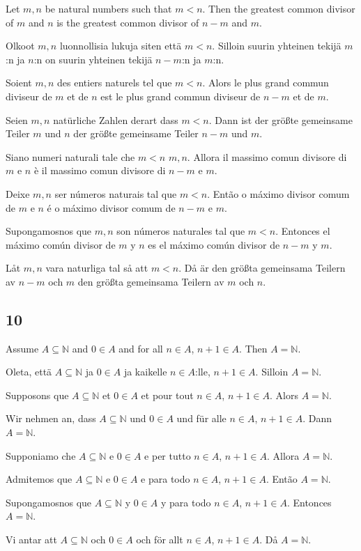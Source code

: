 \documentclass{article}
\begin{document}
Let $ m, n $ be natural numbers such that $ m < n $. Then the greatest common divisor of $ m $ and $ n $ is the greatest common divisor of $ n-m $ and $ m $.

Olkoot $ m, n $ luonnollisia lukuja siten että $ m < n $. Silloin suurin yhteinen tekijä $ m $:n ja $ n $:n on suurin yhteinen tekijä $ n-m $:n ja $ m $:n.

Soient $ m, n $ des entiers naturels tel que $ m < n $. Alors le plus grand commun diviseur de $ m $ et de $ n $ est le plus grand commun diviseur de $ n-m $ et de $ m $.

Seien $ m, n $ natürliche Zahlen derart dass $ m < n $. Dann ist der größte gemeinsame Teiler $ m $ und $ n $ der größte gemeinsame Teiler $ n-m $ und $ m $.

Siano numeri naturali tale che $ m < n $ $ m, n $. Allora il massimo comun divisore di $ m $ e $ n $ è il massimo comun divisore di $ n-m $ e $ m $.

Deixe $ m, n $ ser números naturais tal que $ m < n $. Então o máximo divisor comum de $ m $ e $ n $ é o máximo divisor comum de $ n-m $ e $ m $.

Supongamosnos que $ m, n $ son números naturales tal que $ m < n $. Entonces el máximo común divisor de $ m $ y $ n $ es el máximo común divisor de $ n-m $ y $ m $.

Låt $ m, n $ vara naturliga tal så att $ m < n $. Då är den größta gemeinsama Teilern av $ n-m $ och $ m $ den größta gemeinsama Teilern av $ m $ och $ n $.

\subsection*{10}

Assume $ A \subseteq \mathbb{N} $ and $ 0 \in A $ and for all $ n \in A $, $ n + 1 \in A $. Then $ A = \mathbb{N} $.

Oleta, että $ A \subseteq \mathbb{N} $ ja $ 0 \in A $ ja kaikelle $ n \in A $:lle, $ n + 1 \in A $. Silloin $ A = \mathbb{N} $.

Supposons que $ A \subseteq \mathbb{N} $ et $ 0 \in A $ et pour tout $ n \in A $, $ n + 1 \in A $. Alors $ A = \mathbb{N} $.

Wir nehmen an, dass $ A \subseteq \mathbb{N} $ und $ 0 \in A $ und für alle $ n \in A $, $ n + 1 \in A $. Dann $ A = \mathbb{N} $.

Supponiamo che $ A \subseteq \mathbb{N} $ e $ 0 \in A $ e per tutto $ n \in A $, $ n + 1 \in A $. Allora $ A = \mathbb{N} $.

Admitemos que $ A \subseteq \mathbb{N} $ e $ 0 \in A $ e para todo $ n \in A $, $ n + 1 \in A $. Então $ A = \mathbb{N} $.

Supongamosnos que $ A \subseteq \mathbb{N} $ y $ 0 \in A $ y para todo $ n \in A $, $ n + 1 \in A $. Entonces $ A = \mathbb{N} $.

Vi antar att $ A \subseteq \mathbb{N} $ och $ 0 \in A $ och för allt $ n \in A $, $ n + 1 \in A $. Då $ A = \mathbb{N} $.
\end{document}

